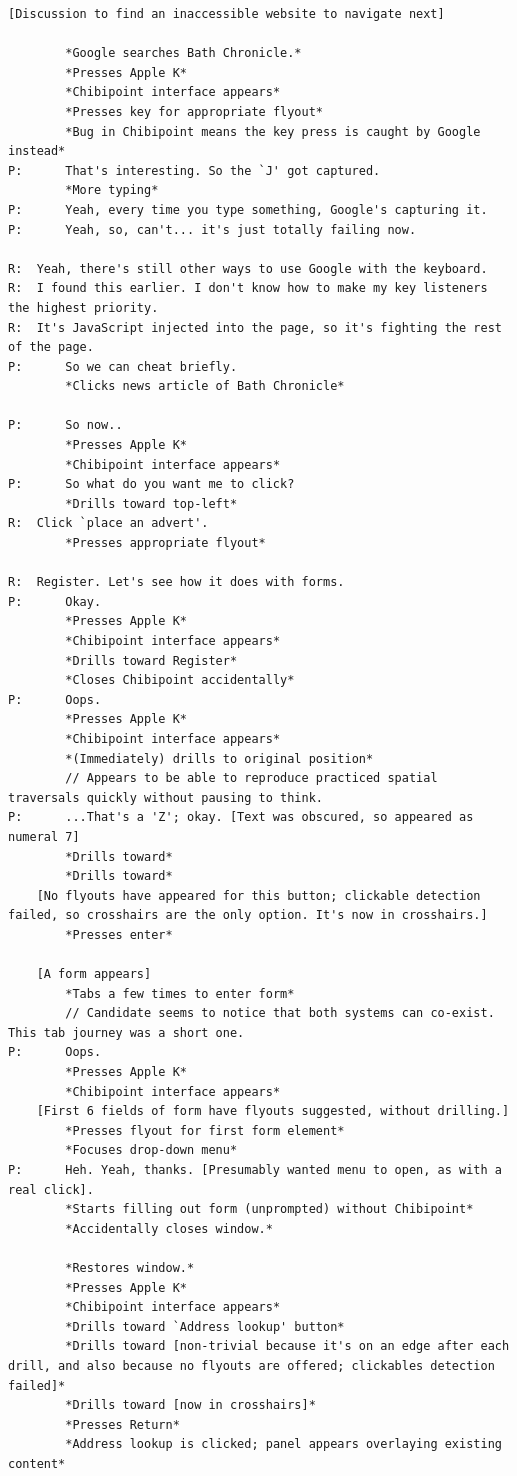 \documentclass[11pt,openright,a4paper]{report}
\begin{document}
\begin{lstlisting}[caption={Transcript of Usability Study}, label={lst:usabilityTrans}, style=basic, language=custom, flexiblecolumns=true]
	[Discussion to find an inaccessible website to navigate next]

		*Google searches Bath Chronicle.*
		*Presses Apple K*
		*Chibipoint interface appears*
		*Presses key for appropriate flyout*
		*Bug in Chibipoint means the key press is caught by Google instead*
P:		That's interesting. So the `J' got captured.
		*More typing*
P:		Yeah, every time you type something, Google's capturing it.
P:		Yeah, so, can't... it's just totally failing now.

R:	Yeah, there's still other ways to use Google with the keyboard.
R:	I found this earlier. I don't know how to make my key listeners the highest priority.
R:	It's JavaScript injected into the page, so it's fighting the rest of the page.
P:		So we can cheat briefly.
		*Clicks news article of Bath Chronicle*

P:		So now..
		*Presses Apple K*
		*Chibipoint interface appears*
P:		So what do you want me to click?
		*Drills toward top-left*
R:	Click `place an advert'.
		*Presses appropriate flyout*

R:	Register. Let's see how it does with forms.
P:		Okay.
		*Presses Apple K*
		*Chibipoint interface appears*
		*Drills toward Register*
		*Closes Chibipoint accidentally*
P:		Oops.
		*Presses Apple K*
		*Chibipoint interface appears*
		*(Immediately) drills to original position*
		// Appears to be able to reproduce practiced spatial traversals quickly without pausing to think.
P:		...That's a 'Z'; okay. [Text was obscured, so appeared as numeral 7]
		*Drills toward*
		*Drills toward*
	[No flyouts have appeared for this button; clickable detection failed, so crosshairs are the only option. It's now in crosshairs.]
		*Presses enter*

	[A form appears]
		*Tabs a few times to enter form*
		// Candidate seems to notice that both systems can co-exist. This tab journey was a short one.
P:		Oops.
		*Presses Apple K*
		*Chibipoint interface appears*
	[First 6 fields of form have flyouts suggested, without drilling.]
		*Presses flyout for first form element*
		*Focuses drop-down menu*
P:		Heh. Yeah, thanks. [Presumably wanted menu to open, as with a real click].
		*Starts filling out form (unprompted) without Chibipoint*
		*Accidentally closes window.*

		*Restores window.*
		*Presses Apple K*
		*Chibipoint interface appears*
		*Drills toward `Address lookup' button*
		*Drills toward [non-trivial because it's on an edge after each drill, and also because no flyouts are offered; clickables detection failed]*
		*Drills toward [now in crosshairs]*
		*Presses Return*
		*Address lookup is clicked; panel appears overlaying existing content*


\end{lstlisting}
\end{document}
